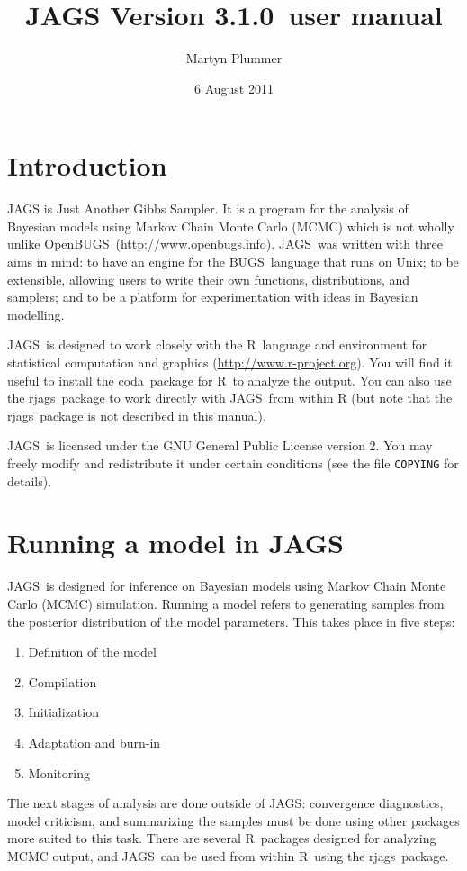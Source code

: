 \documentclass[11pt, a4paper, titlepage]{report}
\newcommand{\release}{3.1.0}
\newcommand{\JAGS}{\textsf{JAGS}}
\newcommand{\rjags}{\textsf{rjags}}
\newcommand{\BUGS}{\textsf{BUGS}}
\newcommand{\OpenBUGS}{\textsf{OpenBUGS}}
\newcommand{\R}{\textsf{R}}
\newcommand{\CODA}{\textsf{coda}}
\begin{document}
\title{JAGS Version \release\ user manual}
\author{Martyn Plummer}
\date{6 August 2011}
\maketitle

\tableofcontents

\chapter{Introduction}

JAGS is Just Another Gibbs Sampler.  It is a program for the analysis
of Bayesian models using Markov Chain Monte Carlo (MCMC) which is not
wholly unlike
\OpenBUGS\ (\url{http://www.openbugs.info}). \JAGS\ was written
with three aims in mind: to have an engine for the \BUGS\ language
that runs on Unix; to be extensible, allowing users to write their own
functions, distributions, and samplers; and to be a platform for
experimentation with ideas in Bayesian modelling.

\JAGS\ is designed to work closely with the \R\ language and
environment for statistical computation and graphics
(\url{http://www.r-project.org}).  You will find it useful to install
the \CODA\ package for \R\ to analyze the output. You can also use the
\rjags\ package to work directly with \JAGS\ from within R (but note
that the \rjags\ package is not described in this manual).

\JAGS\ is licensed under the GNU General Public License
version 2. You may freely modify and redistribute it under certain
conditions (see the file \texttt{COPYING} for details).

\chapter{Running a model in \JAGS}

\JAGS\ is designed for inference on Bayesian models using Markov Chain
Monte Carlo (MCMC) simulation.  Running a model refers to generating
samples from the posterior distribution of the model parameters.  This
takes place in five steps:
\begin{enumerate}
\item Definition of the model
\item Compilation
\item Initialization
\item Adaptation and burn-in
\item Monitoring
\end{enumerate}
The next stages of analysis are done outside of \JAGS: convergence
diagnostics, model criticism, and summarizing the samples must be done
using other packages more suited to this task. There are several
\R\ packages designed for analyzing MCMC output, and \JAGS\ can be
used from within \R\ using the \rjags\ package.
\end{document}
